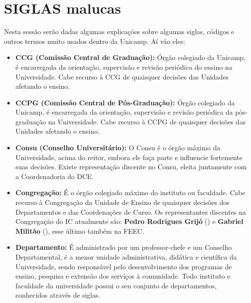 
\section{SIGLAS malucas}

Nesta sessão serão dadas algumas explicações sobre algumas siglas, códigos
e outros termos muito usados dentro da Unicamp. Aí vão eles:

\begin{itemize}
    \item  \textbf{CCG (Comissão Central de Graduação):} Órgão colegiado da
        Unicamp, é encarregada da orientação, supervisão e revisão periódica do
        ensino na Universidade. Cabe recurso à CCG de quaisquer decisões das
        Unidades afetando o ensino.

    \item  \textbf{CCPG (Comissão Central de Pós-Graduação):} Órgão colegiado da
        Unicamp, é encarregada da orientação, supervisão e revisão periódica da
        pós-graduação na Universidade. Cabe recurso à CCPG de quaisquer decisões
        das Unidades afetando o ensino.

    \item  \textbf{Consu (Conselho Universitário):} O Consu é o órgão máximo da
        Universidade, acima do reitor, embora ele faça parte e influencie
        fortemente suas decisões.  Existe representação discente no Consu,
        eleita juntamente com a Coordenadoria do DCE.

    \item  \textbf{Congregação:} É o órgão colegiado máximo do instituto ou
        faculdade.  Cabe recurso à Congregação da Unidade de Ensino de quaisquer
        decisões dos Departamentos e das Coordenações de Curso. Os
        representantes discentes na Congregação do IC atualmente são:
        \textbf{Pedro Rodrigues Grijó} () e
        \textbf{Gabriel Militão} (), esse último
        também na FEEC.

    \item  \textbf{Departamento:} É administrado por um professor-chefe e um
        Conselho Departamental, é a menor unidade administrativa, didática e
        científica da Universidade, sendo responsável pelo desenvolvimento dos
        programas de ensino, pesquisa e extensão dos serviços à comunidade. Todo
        instituto e faculdade da universidade possui o seu conjunto de
        departamentos, conhecidos através de siglas.


\end{itemize}
